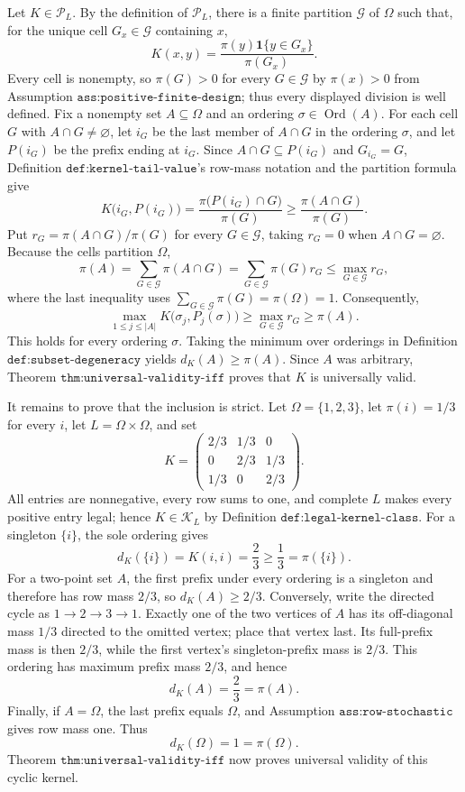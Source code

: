 Let \(K\in\mathcal P_L\).  By the definition of \(\mathcal P_L\), there is a finite partition \(\mathcal G\) of \(\Omega\) such that, for the unique cell \(G_x\in\mathcal G\) containing \(x\),
\[
K(x,y)=\frac{\pi(y)\mathbf 1\{y\in G_x\}}{\pi(G_x)}.
\]
Every cell is nonempty, so \(\pi(G)>0\) for every \(G\in\mathcal G\) by \(\pi(x)>0\) from Assumption \(\texttt{ass:positive-finite-design}\); thus every displayed division is well defined.  Fix a nonempty set \(A\subseteq\Omega\) and an ordering \(\sigma\in\operatorname{Ord}(A)\).  For each cell \(G\) with \(A\cap G\neq\varnothing\), let \(i_G\) be the last member of \(A\cap G\) in the ordering \(\sigma\), and let \(P(i_G)\) be the prefix ending at \(i_G\).  Since \(A\cap G\subseteq P(i_G)\) and \(G_{i_G}=G\), Definition \(\texttt{def:kernel-tail-value}\)'s row-mass notation and the partition formula give
\[
K\bigl(i_G,P(i_G)\bigr)
=\frac{\pi\bigl(P(i_G)\cap G\bigr)}{\pi(G)}
\geq \frac{\pi(A\cap G)}{\pi(G)}.
\]
Put \(r_G=\pi(A\cap G)/\pi(G)\) for every \(G\in\mathcal G\), taking \(r_G=0\) when \(A\cap G=\varnothing\).  Because the cells partition \(\Omega\),
\[
\pi(A)=\sum_{G\in\mathcal G}\pi(A\cap G)
=\sum_{G\in\mathcal G}\pi(G)r_G
\leq \max_{G\in\mathcal G}r_G,
\]
where the last inequality uses \(\sum_{G\in\mathcal G}\pi(G)=\pi(\Omega)=1\).  Consequently,
\[
\max_{1\leq j\leq |A|}K\bigl(\sigma_j,P_j(\sigma)\bigr)
\geq \max_{G\in\mathcal G}r_G
\geq \pi(A).
\]
This holds for every ordering \(\sigma\).  Taking the minimum over orderings in Definition \(\texttt{def:subset-degeneracy}\) yields \(d_K(A)\geq\pi(A)\).  Since \(A\) was arbitrary, Theorem \(\texttt{thm:universal-validity-iff}\) proves that \(K\) is universally valid.

It remains to prove that the inclusion is strict.  Let \(\Omega=\{1,2,3\}\), let \(\pi(i)=1/3\) for every \(i\), let \(L=\Omega\times\Omega\), and set
\[
K=\begin{pmatrix}
2/3&1/3&0\\
0&2/3&1/3\\
1/3&0&2/3
\end{pmatrix}.
\]
All entries are nonnegative, every row sums to one, and complete \(L\) makes every positive entry legal; hence \(K\in\mathcal K_L\) by Definition \(\texttt{def:legal-kernel-class}\).  For a singleton \(\{i\}\), the sole ordering gives
\[
d_K(\{i\})=K(i,i)=\frac23\geq\frac13=\pi(\{i\}).
\]
For a two-point set \(A\), the first prefix under every ordering is a singleton and therefore has row mass \(2/3\), so \(d_K(A)\geq2/3\).  Conversely, write the directed cycle as \(1\to2\to3\to1\).  Exactly one of the two vertices of \(A\) has its off-diagonal mass \(1/3\) directed to the omitted vertex; place that vertex last.  Its full-prefix mass is then \(2/3\), while the first vertex's singleton-prefix mass is \(2/3\).  This ordering has maximum prefix mass \(2/3\), and hence
\[
d_K(A)=\frac23=\pi(A).
\]
Finally, if \(A=\Omega\), the last prefix equals \(\Omega\), and Assumption \(\texttt{ass:row-stochastic}\) gives row mass one.  Thus
\[
d_K(\Omega)=1=\pi(\Omega).
\]
Theorem \(\texttt{thm:universal-validity-iff}\) now proves universal validity of this cyclic kernel.

